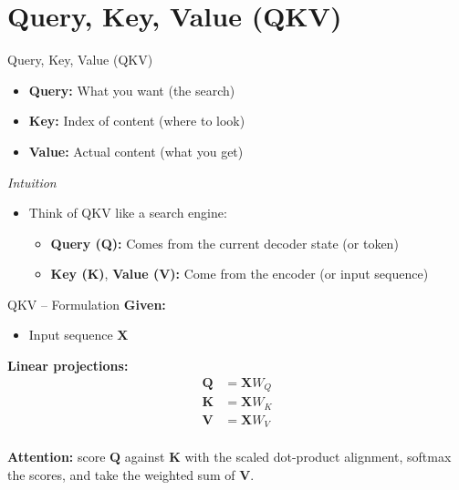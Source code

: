 \section{Query, Key, Value (QKV)}
\begin{frame}{Query, Key, Value (QKV)}
  \begin{itemize}
    \item[$\blacktriangleright$] \textbf{Query:} What you want (the search)
    \item[$\blacktriangleright$] \textbf{Key:} Index of content (where to look)
    \item[$\blacktriangleright$] \textbf{Value:} Actual content (what you get)
  \end{itemize}
  \vspace{1em}
  \textit{Intuition}
  \begin{itemize}
    \item[] Think of QKV like a search engine:
    \begin{itemize}
      \item[$\blacktriangleright$] \textbf{Query (Q):} Comes from the current decoder state (or token)
      \item[$\blacktriangleright$] \textbf{Key (K)}, \textbf{Value (V):} Come from the encoder (or input sequence)
    \end{itemize}
  \end{itemize}
\end{frame}

\begin{frame}{QKV -- Formulation}
\textbf{Given:}
\begin{itemize}
    \item[$\blacktriangleright$] Input sequence $\mathbf{X}$
\end{itemize}
\vspace{0.5em}
\textbf{Linear projections:}
\begin{align*}
    \mathbf{Q} &= \mathbf{X} W_Q \\
    \mathbf{K} &= \mathbf{X} W_K \\
    \mathbf{V} &= \mathbf{X} W_V \\
\end{align*}

\vspace{0.5em}
\textbf{Attention:} score $\mathbf{Q}$ against $\mathbf{K}$ with the scaled dot-product alignment, softmax the scores, and take the weighted sum of $\mathbf{V}$.
\end{frame}

